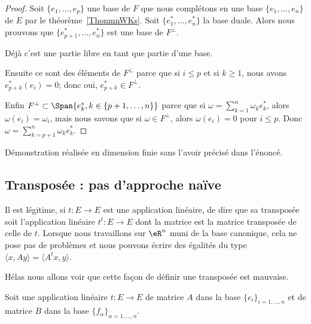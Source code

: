 \begin{proof}
    Soit \( \{ e_1,\ldots, e_p \}\) une base de \( F\) que nous complétons en une base \( \{ e_1,\ldots, e_n \}\) de \( E\) par le théorème~\ref{ThonmnWKs}. Soit \( \{ e_1^*,\ldots, e^*_n \}\) la base duale. Alors nous prouvons que \( \{ e^*_{p+1},\ldots, e_n^* \}\) est une base de \( F^{\perp}\).

    Déjà c'est une partie libre en tant que partie d'une base.

    Ensuite ce sont des éléments de \( F^{\perp}\) parce que si \( i\leq p\) et si \( k\geq 1\), nous avons \( e^*_{p+k}(e_i)=0\); donc oui, \( e^*_{p+k}\in F^{\perp}\).

    Enfin \( F^{\perp}\subset\Span\{ e_{k}^*, k \in \{p+1, \dots, n\}\}\) parce que si \( \omega=\sum_{k=1}^n\omega_ke_k^*\), alors \( \omega(e_i)=\omega_i\), mais nous savons que si \( \omega\in F^{\perp}\), alors \( \omega(e_i)=0\) pour \( i\leq p\). Donc \( \omega=\sum_{k=p+1}^n\omega_ke^*_k\).
\end{proof}

\begin{probleme}
Démonstration réalisée en dimension finie sans l'avoir précisé dans l'énoncé.
\end{probleme}

\subsection{Transposée : pas d'approche naïve}
\label{SUBSECooGPXVooEYwIiJ}

Il est légitime, si \( t\colon E\to E\) est une application linéaire, de dire que sa transposée soit l'application linéaire \( t^t\colon E\to E\) dont la matrice est la matrice transposée de celle de \( t\). Lorsque nous travaillons sur \( \eR^n\) muni de la base canonique, cela ne pose pas de problèmes et nous pouvons écrire des égalités du type \( \langle x, Ay\rangle =\langle A^tx, y\rangle \).

Hélas nous allons voir que cette façon de définir une transposée est mauvaise.

Soit une application linéaire \( t\colon E\to E\) de matrice \( A\) dans la base \( \{ e_i \}_{i=1,\ldots, n}\) et de matrice \( B\) dans la base \( \{ f_{\alpha} \}_{\alpha=1,\ldots, n}\).

